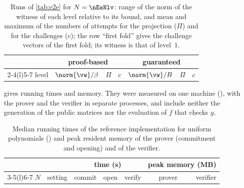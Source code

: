 \begin{table}[h]
\centering\small
\setlength{\tabcolsep}{4pt}
\begin{tabular}{@{}lrrrrrr@{}}
\toprule
 & \multicolumn{3}{c}{proof-based} & \multicolumn{3}{c}{guaranteed}\\
\cmidrule(lr){2-4}\cmidrule(l){5-7}
level & $\norm{\vw}/\beta$ & $\Pi$ & $c$ & $\norm{\vw}/B$ & $\Pi$ & $c$\\
\midrule

\bottomrule
\end{tabular}
\caption{Runs of \cref{tab:e2e} for $N=\nEeNlv$: range of the norm of the witness of each level relative to its bound, and mean and maximum of the numbers of attempts for the projection ($\Pi$) and for the challenges ($c$); the row ``first fold'' gives the challenge vectors of the first fold; its witness is that of level~$1$.}
\label{tab:e2e-levels}
\end{table}

 gives running times and memory. They were measured on one machine (\nEeMachine), with the prover and the verifier in separate processes, and include neither the generation of the public matrices nor the evaluation of $f$ that checks $y$.

\begin{table}[h]
\centering\small
\begin{tabular}{@{}llrrrrr@{}}
\toprule
 & & \multicolumn{3}{c}{time (s)} & \multicolumn{2}{c}{peak memory (MB)}\\
\cmidrule(lr){3-5}\cmidrule(l){6-7}
$N$ & setting & commit & open & verify & prover & verifier\\
\midrule

\bottomrule
\end{tabular}
\caption{Median running times of the reference implementation for uniform polynomials (\nEeTimeNote) and peak resident memory of the prover (commitment and opening) and of the verifier.}
\label{tab:e2e-time}
\end{table}
